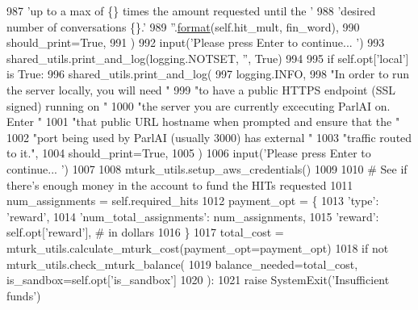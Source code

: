 \begin{DoxyCode}
987                 \textcolor{stringliteral}{'up to a max of \{\} times the amount requested until the '}
988                 \textcolor{stringliteral}{'desired number of conversations \{\}.'}
989                 \textcolor{stringliteral}{''}.\hyperlink{namespaceparlai_1_1chat__service_1_1services_1_1messenger_1_1shared__utils_a32e2e2022b824fbaf80c747160b52a76}{format}(self.hit\_mult, fin\_word),
990                 should\_print=\textcolor{keyword}{True},
991             )
992         input(\textcolor{stringliteral}{'Please press Enter to continue... '})
993         shared\_utils.print\_and\_log(logging.NOTSET, \textcolor{stringliteral}{''}, \textcolor{keyword}{True})
994 
995         \textcolor{keywordflow}{if} self.opt[\textcolor{stringliteral}{'local'}] \textcolor{keywordflow}{is} \textcolor{keyword}{True}:
996             shared\_utils.print\_and\_log(
997                 logging.INFO,
998                 \textcolor{stringliteral}{"In order to run the server locally, you will need "}
999                 \textcolor{stringliteral}{"to have a public HTTPS endpoint (SSL signed) running on "}
1000                 \textcolor{stringliteral}{"the server you are currently excecuting ParlAI on. Enter "}
1001                 \textcolor{stringliteral}{"that public URL hostname when prompted and ensure that the "}
1002                 \textcolor{stringliteral}{"port being used by ParlAI (usually 3000) has external "}
1003                 \textcolor{stringliteral}{"traffic routed to it."},
1004                 should\_print=\textcolor{keyword}{True},
1005             )
1006             input(\textcolor{stringliteral}{'Please press Enter to continue... '})
1007 
1008         mturk\_utils.setup\_aws\_credentials()
1009 
1010         \textcolor{comment}{# See if there's enough money in the account to fund the HITs requested}
1011         num\_assignments = self.required\_hits
1012         payment\_opt = \{
1013             \textcolor{stringliteral}{'type'}: \textcolor{stringliteral}{'reward'},
1014             \textcolor{stringliteral}{'num\_total\_assignments'}: num\_assignments,
1015             \textcolor{stringliteral}{'reward'}: self.opt[\textcolor{stringliteral}{'reward'}],  \textcolor{comment}{# in dollars}
1016         \}
1017         total\_cost = mturk\_utils.calculate\_mturk\_cost(payment\_opt=payment\_opt)
1018         \textcolor{keywordflow}{if} \textcolor{keywordflow}{not} mturk\_utils.check\_mturk\_balance(
1019             balance\_needed=total\_cost, is\_sandbox=self.opt[\textcolor{stringliteral}{'is\_sandbox'}]
1020         ):
1021             \textcolor{keywordflow}{raise} SystemExit(\textcolor{stringliteral}{'Insufficient funds'})

\end{DoxyCode}
